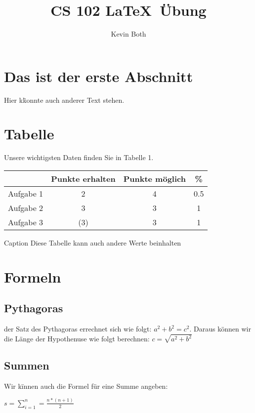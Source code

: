 \documentclass [ ] {article}
\title {CS 102 \LaTeX ~\"Ubung}
\author {Kevin Both}
\begin{document}
\maketitle

\section{Das ist der erste Abschnitt}
Hier k\"konnte auch anderer Text stehen.
\section{Tabelle}
Unsere wichtigsten Daten finden Sie in Tabelle 1.
\begin{table}[h]
\begin{tabular}{c|c|c|c}
 \textbf{ }&\textbf{Punkte erhalten}&\textbf{Punkte m\"oglich}&\textbf{\%}\\
\hline{Aufgabe 1}& {2} &{4}&{0.5}\\
{Aufgabe 2} &{3} &{3} &{1}\\
{Aufgabe 3} &(3) &{3}&{1}
\end{tabular}
Caption {Diese Tabelle kann auch andere Werte beinhalten}
\end{table}
\section {Formeln}
\subsection {Pythagoras}
der Satz des Pythagoras errechnet sich wie folgt: $ a^{2} +b^{2}=c^{2}$. Daraus k\"onnen wir die L\"ange der Hypothenuse wie folgt berechnen: $c= \sqrt {a^{2}+b^{2}}$
\subsection{Summen}
Wir k\"innen auch die Formel f\"ur eine Summe angeben:\\
\begin {center}

$ s=\sum\limits_{i=1}^{n}=\frac{n*(n+1)}{2}$






\end{center}
\end{document}
